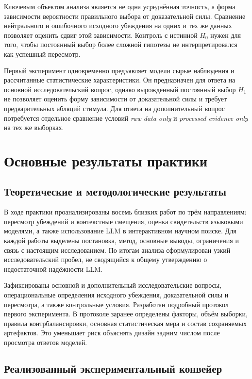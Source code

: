 \documentclass[a4paper,14pt]{extarticle}
\newcommand{\Hnull}{\ensuremath{H_0}}
\newcommand{\Hone}{\ensuremath{H_1}}
\begin{document}
Ключевым объектом анализа является не одна усреднённая точность, а форма зависимости вероятности правильного выбора от доказательной силы. Сравнение нейтрального и ошибочного исходного убеждения на одних и тех же данных позволяет оценить сдвиг этой зависимости. Контроль с истинной \Hnull{} нужен для того, чтобы постоянный выбор более сложной гипотезы не интерпретировался как успешный пересмотр.

Первый эксперимент одновременно предъявляет модели сырые наблюдения и рассчитанные статистические характеристики. Он предназначен для ответа на основной исследовательский вопрос, однако вырожденный постоянный выбор \Hone{} не позволяет оценить форму зависимости от доказательной силы и требует предварительных абляций стимула. Для ответа на дополнительный вопрос потребуется отдельное сравнение условий \textit{raw data only} и \textit{processed evidence only} на тех же выборках.

\section{Основные результаты практики}

\subsection{Теоретические и методологические результаты}

В ходе практики проанализированы восемь близких работ по трём направлениям: пересмотр убеждений и контекстные смещения, оценка свидетельств языковыми моделями, а также использование LLM в интерактивном научном поиске. Для каждой работы выделены постановка, метод, основные выводы, ограничения и связь с настоящим исследованием. По итогам анализа сформулирован узкий исследовательский пробел, не сводящийся к общему утверждению о недостаточной надёжности LLM.

Зафиксированы основной и дополнительный исследовательские вопросы, операциональные определения исходного убеждения, доказательной силы и пересмотра, а также контрольные условия. Разработан подробный протокол первого эксперимента. В протоколе заранее определены факторы, объём выборки, правила контрбалансировки, основная статистическая мера и состав сохраняемых артефактов. Это уменьшает риск объяснять дизайн задним числом после просмотра ответов моделей.

\subsection{Реализованный экспериментальный конвейер}
\end{document}
